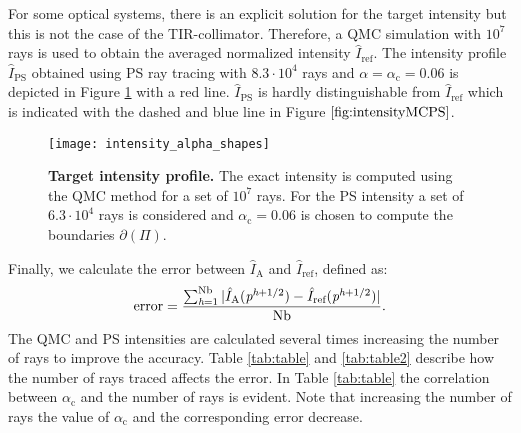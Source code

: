 For some optical systems, there is an explicit solution for the target intensity but this is not the case of the TIR-collimator.
Therefore, a QMC simulation with $10^7$ rays is used to obtain the averaged normalized intensity $\hat{I}_{\textrm{ref}}$.
The intensity profile $\hat{I}_{\textrm{PS}}
$ obtained using PS ray tracing with $8.3\cdot 10^4$ rays and $\alpha= \alpha_\textrm{c} = 0.06$ is depicted in Figure \ref{fig:intensityMCPS} with a red line.
$\hat{I}_{\textrm{PS}}$ is hardly distinguishable from $\hat{I}_{\textrm{ref}}$ which is indicated with the dashed and blue line in Figure $\ref{fig:intensityMCPS}$.\\ \indent
  \begin{figure}[h]
    \centering
    \texttt{[image: intensity\_alpha\_shapes]}
\caption{\textbf{Target intensity profile.}
The exact intensity is computed using the QMC method for a set of $10^7$ rays. For the PS intensity a set of $6.3\cdot 10^4$
rays is considered and $\alpha_\textrm{c} = 0.06$ is chosen to compute the boundaries $\partial$$(\Pi)$.}
  \label{fig:intensityMCPS}
\end{figure}
Finally, we calculate the error between $\hat{I}_{\textrm{A}}$ and $\hat{I}_{\textrm{ref}}$, defined as:
\begin{equation}\label{eq:error}
\mbox{error} = \frac{\sum_{\textit{h}= 1}^{\textrm{Nb}}| \hat{I}_{\textrm{A}}(\textit{p}^{\textit{h}+1/2}) - \hat{I}_{\textrm{ref}}(\textit{p}^{\textit{h}+1/2})|}{\textrm{Nb}}.
\end{equation}
The QMC and PS intensities are calculated several times increasing the number of rays to improve the accuracy.
Table \ref{tab:table} and \ref{tab:table2} describe how the number of rays traced affects the error. 
In Table \ref{tab:table} the correlation between $\alpha_\textrm{c}$ and the number of rays is evident.
Note that increasing the number of rays the value of $\alpha_\textrm{c}$ and the corresponding error decrease. 
